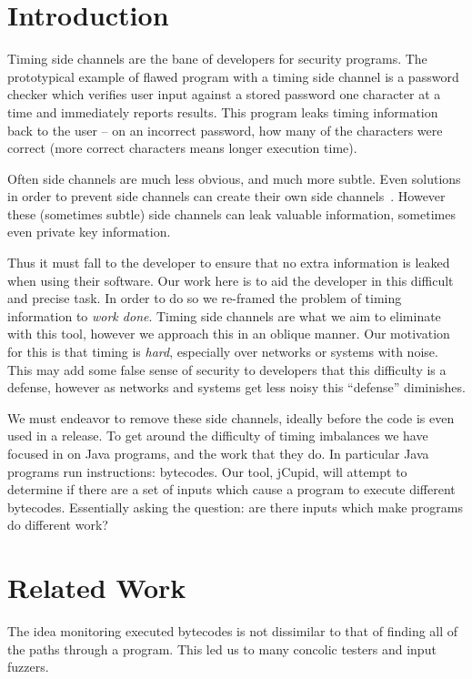 \documentclass[letterpaper,twocolumn,10pt]{article}
\begin{document}
\section{Introduction}

Timing side channels are the bane of developers for security programs. The prototypical example of flawed program with a timing side channel is a password checker which verifies user input against a stored password one character at a time and immediately reports results. This program leaks timing information back to the user -- on an incorrect password, how many of the characters were correct (more correct characters means longer execution time).

Often side channels are much less obvious, and much more subtle. Even solutions in order to prevent side channels can create their own side channels~\cite{al2013lucky}. However these (sometimes subtle) side channels can leak valuable information, sometimes even private key information.

Thus it must fall to the developer to ensure that no extra information is leaked when using their software. Our work here is to aid the developer in this difficult and precise task. In order to do so we re-framed the problem of timing information to \emph{work done}. Timing side channels are what we aim to eliminate with this tool, however we approach this in an oblique manner. Our motivation for this is that timing is \emph{hard}, especially over networks or systems with noise. This may add some false sense of security to developers that this difficulty is a defense, however as networks and systems get less noisy this ``defense'' diminishes.

We must endeavor to remove these side channels, ideally before the code is even used in a release. To get around the difficulty of timing imbalances we have focused in on Java programs, and the work that they do. In particular Java programs run instructions: bytecodes. Our tool, jCupid, will attempt to determine if there are a set of inputs which cause a program to execute different bytecodes. Essentially asking the question: are there inputs which make programs do different work?

\section{Related Work}

The idea monitoring executed bytecodes is not dissimilar to that of finding all of the paths through a program. This led us to many concolic testers and input fuzzers. 
\end{document}
